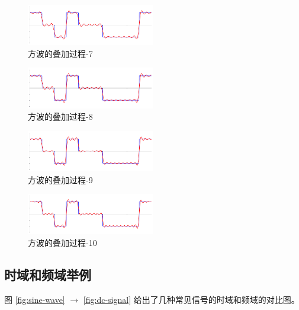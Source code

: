 \documentclass[lang=cn,newtx,10pt,scheme=chinese]{elegantbook}
\begin{document}
\begin{figure}[!htb]
\centering
\includegraphics[width=0.5\textwidth]{fourier_series_arbitrary_function-6.png}
\caption{方波的叠加过程-7}
\label{fig:fourier_series_arbitrary_function-6}
\end{figure}

\begin{figure}[!htb]
\centering
\includegraphics[width=0.5\textwidth]{fourier_series_arbitrary_function-7.png}
\caption{方波的叠加过程-8}
\label{fig:fourier_series_arbitrary_function-7}
\end{figure}

\begin{figure}[!htb]
\centering
\includegraphics[width=0.5\textwidth]{fourier_series_arbitrary_function-8.png}
\caption{方波的叠加过程-9}
\label{fig:fourier_series_arbitrary_function-8}
\end{figure}

\begin{figure}[!htb]
\centering
\includegraphics[width=0.5\textwidth]{fourier_series_arbitrary_function-9.png}
\caption{方波的叠加过程-10}
\label{fig:fourier_series_arbitrary_function-9}
\end{figure}

\subsection{时域和频域举例}

图 \ref{fig:sine-wave} $\rightarrow$ \ref{fig:dc-signal} 给出了几种常见信号的时域和频域的对比图。
\end{document}
